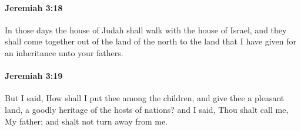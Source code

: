 		\paragraph{Jeremiah 3:18} %
			\label{JEREMIAH-3-18}

			In those days the house of Judah shall walk with the house of Israel, and they shall come together out of the land of the north to the land that I have given for an inheritance unto your fathers.


		\paragraph{Jeremiah 3:19} %
			\label{JEREMIAH-3-19}

			But I said, How shall I put thee among the children, and give thee a pleasant land, a goodly heritage of the hosts of nations? and I said, Thou shalt call me, My father; and shalt not turn away from me.

